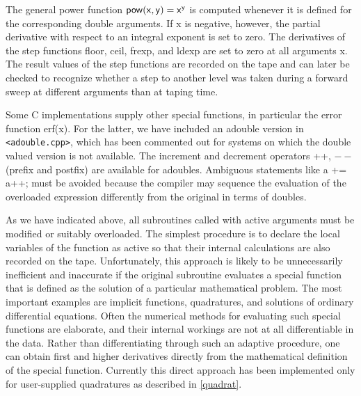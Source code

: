 \documentclass[11pt,twoside]{article}
\begin{document}
The general power function ${\sf pow(x,y)=x^y}$ is computed whenever
it is defined for the corresponding {\sf double} arguments. If {\sf x} is
negative, however, the partial derivative with respect to an integral exponent
is set to zero. 
The derivatives of the step functions 
{\sf floor}, {\sf ceil}, {\sf frexp}, and {\sf ldexp} are set to zero at all
arguments {\sf x}. The result values of the step functions 
are recorded on the tape and can later be checked to recognize 
whether a step to another level was taken during a forward sweep 
at different arguments than at taping time.

Some C implementations supply other special
functions, in particular the error function {\sf erf(x)}. For the
latter, we have included an {\sf adouble} version in \verb=<adouble.cpp>=, which
has been commented out for systems on which the {\sf double} valued version
is not available. The increment and decrement operators {\sf ++}, \boldmath $--$ \unboldmath (prefix and
postfix) are available for {\sf adouble}s.
%
%
Ambiguous statements like {\sf a += a++;} must be 
avoided because the compiler may sequence the evaluation of the
overloaded
expression differently from the original in terms of {\sf double}s.

As we have indicated above, all subroutines called with active arguments
must be modified or suitably overloaded. The simplest procedure is
to declare the local variables of the function as active so that
their internal calculations are also recorded on the tape.
Unfortunately, this approach is likely to be unnecessarily inefficient
and inaccurate if the original subroutine evaluates a special function
that is defined as the solution of a particular mathematical problem.
The most important examples are implicit functions, quadratures,
and solutions of ordinary differential equations. Often
the numerical methods for evaluating such special functions are
elaborate, and their internal workings are not at all differentiable in
the data. Rather than differentiating through such an adaptive
procedure, one can obtain first and higher derivatives directly from
the mathematical definition of the special function. Currently this
direct approach has been implemented only for user-supplied quadratures
as described in \autoref{quadrat}.
%
\end{document}
